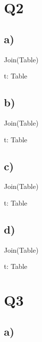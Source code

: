 \documentclass{article}
\begin{document}
\section*{Q2}

\subsection*{\small a)}

\begin{zed}
Join(Table)
\end{zed}

\begin{zed}
\forall t: Table
\end{zed}
    

\subsection*{\small b)}

\begin{zed}
Join(Table)
\end{zed}

\begin{zed}
\forall t: Table
\end{zed}

\subsection*{\small c)}

\begin{zed}
Join(Table)
\end{zed}

\begin{zed}
\forall t: Table
\end{zed}

\subsection*{\small d)}

\begin{zed}
Join(Table)
\end{zed}

\begin{zed}
\forall t: Table
\end{zed}

\section*{Q3}

\subsection*{\small a)}
\end{document}

